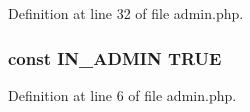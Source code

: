 Definition at line 32 of file admin.\+php.

\hypertarget{admin_8php_ad49472b0cdee543164375bf133a537f1}{
\subsubsection[{I\+N\+\_\+\+A\+D\+M\+I\+N}]{\setlength{\rightskip}{0pt plus 5cm}const I\+N\+\_\+\+A\+D\+M\+I\+N T\+R\+U\+E}}\label{admin_8php_ad49472b0cdee543164375bf133a537f1}


Definition at line 6 of file admin.\+php.

